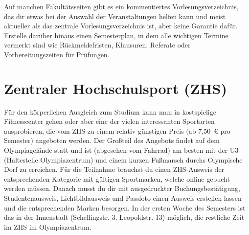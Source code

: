 Auf manchen Fakultätsseiten gibt es ein kommentiertes Vorlesungsverzeichnis, das dir etwas bei der Auswahl der Veranstaltungen helfen kann und meist aktueller als das zentrale Vorlesungsverzeichnis ist, aber keine Garantie dafür. Erstelle darüber hinaus einen Semesterplan, in dem alle wichtigen Termine vermerkt sind wie Rückmeldefristen, Klausuren, Referate oder Vorbereitungszeiten für Prüfungen.

\begin{urlList}
\end{urlList}

	




\section{Zentraler Hochschulsport (ZHS)}

Für den körperlichen Ausgleich zum Studium kann man in kostspielige Fitnesscenter gehen oder aber eine der vielen interessanten Sportarten ausprobieren, die vom ZHS zu einem relativ günstigen Preis (ab 7,50~€ pro Semester) angeboten werden. Der Großteil des Angebots findet auf dem Olympiagelände statt und ist (abgesehen vom Fahrrad) am besten mit der U3 (Haltestelle Olympiazentrum) und einem kurzen Fußmarsch durchs Olympische Dorf zu erreichen. Für die Teilnahme brauchst du einen ZHS-Ausweis der entsprechenden Kategorie mit gültigen Sportmarken, welche online gebucht werden müssen. Danach musst du dir mit ausgedruckter Buchungsbestätigung, Studentenausweis, Lichtbildausweis und Passfoto einen Ausweis erstellen lassen und die entsprechenden Marken besorgen. In der ersten Woche des Semesters ist das in der Innenstadt (Schellingstr. 3, Leopoldstr. 13) möglich, die restliche Zeit im ZHS im Olympiazentrum. 

